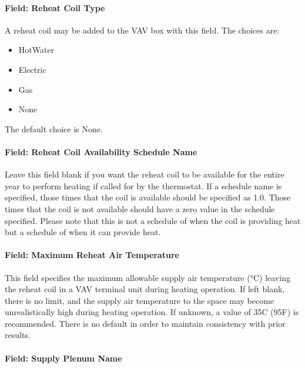 \paragraph{Field: Reheat Coil Type}\label{field-reheat-coil-type-2}

A reheat coil may be added to the VAV box with this field. The choices are:

\begin{itemize}
\item
  HotWater
\item
  Electric
\item
  Gas
\item
  None
\end{itemize}

The default choice is None.

\paragraph{Field: Reheat Coil Availability Schedule Name}\label{field-reheat-coil-availability-schedule-name-2}

Leave this field blank if you want the reheat coil to be available for the entire year to perform heating if called for by the thermostat. If a schedule name is specified, those times that the coil is available should be specified as 1.0. Those times that the coil is not available should have a zero value in the schedule specified. Please note that this is not a schedule of when the coil is providing heat but a schedule of when it can provide heat.

\paragraph{Field: Maximum Reheat Air Temperature}\label{field-maximum-reheat-air-temperature-1-000}

This field specifies the maximum allowable supply air temperature (°C) leaving the reheat coil in a VAV terminal unit during heating operation. If left blank, there is no limit, and the supply air temperature to the space may become unrealistically high during heating operation. If unknown, a value of 35C (95F) is recommended. There is no default in order to maintain consistency with prior results.

\paragraph{Field: Supply Plenum Name}\label{field-supply-plenum-name-3}

